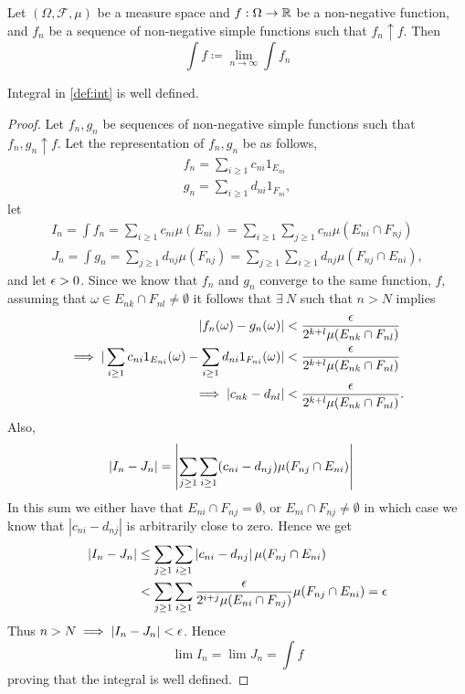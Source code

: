 \begin{definition}\label{def:int}
  Let $(\Omega, \mathscr{F}, \mu)$ be a measure space and $f:\Omega\to \mathbb{R}$ be a non-negative function, and $f_n$ be a sequence of non-negative simple functions such that $f_n \uparrow f$. Then
  $$\int f \coloneqq \lim_{n\to\infty} \int f_n$$
\end{definition}
\begin{proposition}
  Integral in \cref{def:int} is well defined. 
\end{proposition}
\begin{proof}
  Let $f_n, g_n$ be sequences of non-negative simple functions such that $f_n,g_n \uparrow f$. Let the representation of $f_n,g_n$ be as follows,
  \begin{align*}
    f_n = \sum_{i\geq 1} c_{ni} 1_{E_{ni}}\\
    g_n = \sum_{i\geq 1} d_{ni} 1_{F_{ni}},
  \end{align*}
  let
  \begin{align*}
    I_n = \int f_n = \sum_{i\geq 1} c_{ni} \mu(E_{ni}) =\sum_{i\geq 1} \sum_{j\geq 1} c_{ni} \mu(E_{ni}\cap F_{nj}) \\
    J_n = \int g_n = \sum_{j\geq 1} d_{nj} \mu(F_{nj}) =\sum_{j\geq 1} \sum_{i\geq 1} d_{nj} \mu(F_{nj}\cap E_{ni}),
  \end{align*}
  and let $\epsilon>0$. Since we know that $f_n$ and $g_n$ converge to the same function, $f$, assuming that $\omega \in E_{nk}\cap F_{nl} \neq \emptyset$ it follows that $\exists\ N$ such that $n>N$ implies
  \begin{align*}
    |f_n(\omega) - g_n(\omega)| &< \frac{\epsilon}{2^{k+l}\mu(E_{nk}\cap F_{nl})}\\
    \implies |\sum_{i\geq 1} c_{ni} 1_{E_{ni}}(\omega) - \sum_{i\geq 1} d_{ni} 1_{F_{ni}}(\omega)| &<\frac{\epsilon}{2^{k+l}\mu(E_{nk}\cap F_{nl})}\\
    \implies |c_{nk} - d_{nl}|&<\frac{\epsilon}{2^{k+l}\mu(E_{nk}\cap F_{nl})}.
  \end{align*}
  Also,
  \begin{align*}
    |I_n - J_n| &= \left|\sum_{j\geq 1} \sum_{i\geq 1} (c_{ni} - d_{nj}) \mu(F_{nj}\cap E_{ni})\right|
  \end{align*}
  In this sum we either have that $E_{ni}\cap F_{nj} = \emptyset$, or $E_{ni}\cap F_{nj}\neq \emptyset$ in which case we know that $|c_{ni}-d_{nj}|$ is arbitrarily close to zero. Hence we get
  \begin{align*} 
    |I_n - J_n| &\leq \sum_{j\geq 1} \sum_{i\geq 1} \left|c_{ni} - d_{nj}\right| \mu(F_{nj}\cap E_{ni})\\
                &< \sum_{j\geq 1} \sum_{i\geq 1} \frac{\epsilon}{2^{i+j}\mu(E_{ni}\cap F_{nj})}\mu(F_{nj}\cap E_{ni}) = \epsilon
  \end{align*}
  Thus $n>N\implies |I_n - J_n|< \epsilon$. Hence
  \[\lim I_n = \lim J_n = \int f\]
  proving that the integral is well defined. 
\end{proof}
